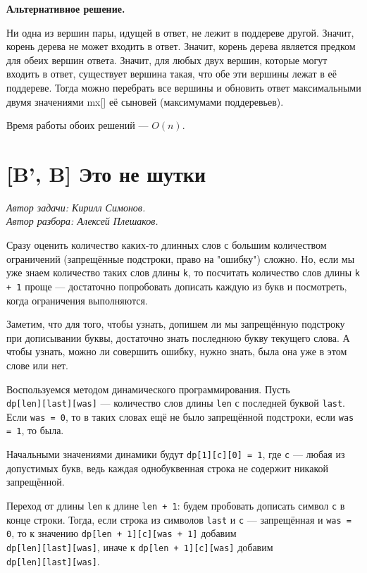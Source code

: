 \documentclass[12pt]{article}
\theoremstyle{definition}
\begin{document}
\textbf{Альтернативное решение.}

Ни одна из вершин пары, идущей в ответ, не лежит в поддереве другой. Значит, корень дерева не может входить в ответ. Значит, корень дерева является предком для обеих вершин ответа. Значит, для любых двух вершин, которые могут входить в ответ, существует вершина такая, что обе эти вершины лежат в её поддереве. Тогда можно перебрать все вершины и обновить ответ максимальными двумя значениями mx[] её сыновей (максимумами поддеревьев).

Время работы обоих решений --- $O(n)$.

\section{[B', B] Это не шутки}
\textit{Автор задачи: Кирилл Симонов.} \\
\textit{Автор разбора: Алексей Плешаков.}

Сразу оценить количество каких-то длинных слов с большим количеством ограничений (запрещённые подстроки, право на "ошибку") сложно. Но, если мы уже знаем количество таких слов длины \verb|k|, то посчитать количество слов длины \verb|k + 1| проще --- достаточно попробовать дописать каждую из букв и посмотреть, когда ограничения выполняются.

Заметим, что для того, чтобы узнать, допишем ли мы запрещённую подстроку при дописывании буквы, достаточно знать последнюю букву текущего слова. А чтобы узнать, можно ли совершить ошибку, нужно знать, была она уже в этом слове или нет.

Воспользуемся методом динамического программирования. Пусть \\
\verb|dp[len][last][was]| --- количество слов длины \verb|len| с последней буквой \verb|last|. Если \verb|was = 0|, то в таких словах ещё не было запрещённой подстроки, если \verb|was = 1|, то была.

Начальными значениями динамики будут \verb|dp[1][c][0] = 1|, где \verb|c| --- любая из допустимых букв, ведь каждая однобуквенная строка не содержит никакой запрещённой.

Переход от длины \verb|len| к длине \verb|len + 1|: будем пробовать дописать символ \verb|с| в конце строки. Тогда, если строка из символов \verb|last| и \verb|c| --- запрещённая
и \verb|was = 0|, то к значению \verb|dp[len + 1][c][was + 1]| добавим \\
\verb|dp[len][last][was]|, иначе к \verb|dp[len + 1][c][was]| добавим \\
\verb|dp[len][last][was]|.
\end{document}

